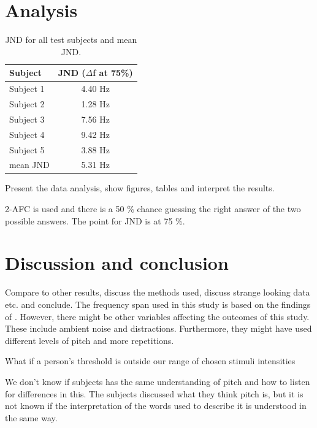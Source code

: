 \section*{Analysis}
%
\begin{table}[H]
\centering
\begin{tabular}{l|c}
Subject     & JND ($\Delta$f at 75\%) \\\hline
Subject 1   & 4.40 Hz                 \\\hline
Subject 2   & 1.28 Hz                 \\\hline
Subject 3   & 7.56 Hz                 \\\hline
Subject 4   & 9.42 Hz                 \\\hline
Subject 5   & 3.88 Hz                 \\\hline
mean JND & 5.31 Hz       
\end{tabular}
\caption{JND for all test subjects and mean JND.}
\label{tab:tabelJNDl}         
\end{table}
%
Present the data analysis, show figures, tables and interpret the results.

2-AFC is used and there is a 50 \% chance guessing the right answer of the two possible answers. The point for JND is at 75 \%.

\section*{Discussion and conclusion} 
Compare to other results, discuss the methods used, discuss strange looking data etc. and conclude.
The frequency span used in this study is based on the findings of \citep{Wier1977}. However, there might be other variables affecting the outcomes of this study. These include ambient noise and distractions. Furthermore, they might have used different levels of pitch and more repetitions.

What if a person’s threshold is outside our range of chosen stimuli intensities 

We don’t know if subjects has the same understanding of pitch and how to listen for differences in this. The subjects discussed what they think pitch is, but it is not known if the interpretation of the words used to describe it is understood in the same way.





 
